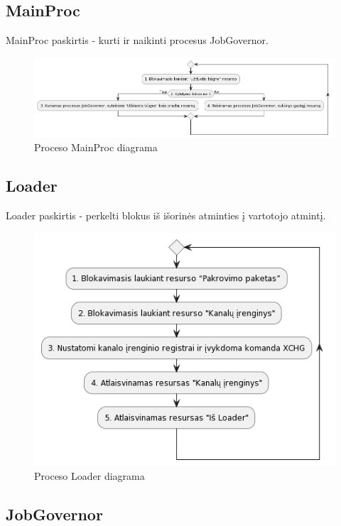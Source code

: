 \documentclass{VUMIFInfKursinis}
\begin{document}
\subsection{MainProc}

MainProc paskirtis - kurti ir naikinti procesus JobGovernor.

\begin{figure}[H]
	\centering	
	\includegraphics[scale=0.40]{img/MainProc}
	\caption{Proceso MainProc diagrama}   %
	\label{img:MainProc}
\end{figure}

\subsection{Loader}

Loader paskirtis - perkelti blokus iš išorinės atminties į vartotojo atmintį.

\begin{figure}[H]
	\centering	
	\includegraphics[scale=0.65]{img/Loader}
	\caption{Proceso Loader diagrama}   %
	\label{img:Loader}
\end{figure}

\subsection{JobGovernor}
\end{document}
